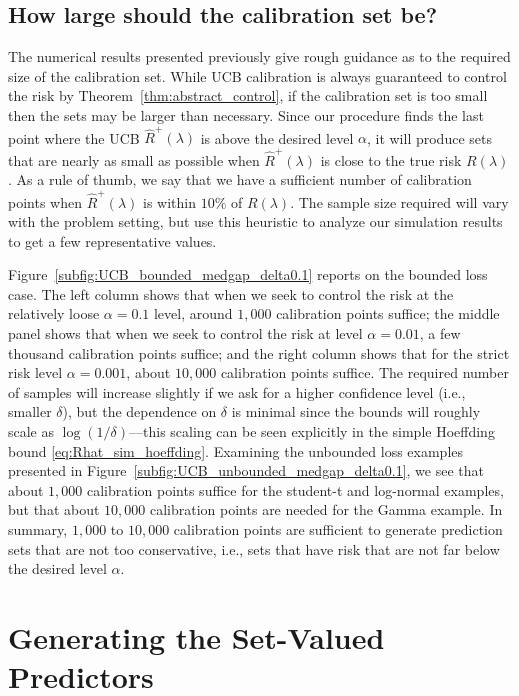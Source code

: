 \documentclass[10pt]{article}
\begin{document}
\subsection{How large should the calibration set be?}
The numerical results presented previously give rough guidance as to the required size of the calibration set. While UCB calibration is always guaranteed to control the risk by Theorem~\ref{thm:abstract_control}, if the calibration set is too small then the sets may be larger than necessary.
Since our procedure finds the last point where the UCB $\widehat{R}^+(\lambda)$ is above the desired level $\alpha$, it will produce sets that are nearly as small as possible when $\widehat{R}^+(\lambda)$ is close to the true risk $R(\lambda)$. As a rule of thumb, we say that we have a sufficient number of calibration points when $\widehat{R}^+(\lambda)$ is within $10\%$ of $R(\lambda)$. The sample size required will vary with the problem setting, but use this heuristic to analyze our simulation results to get a few representative values.

Figure~\ref{subfig:UCB_bounded_medgap_delta0.1} reports on the bounded loss case. The left column shows that when we seek to control the risk at the relatively loose $\alpha = 0.1$ level, around $1,000$ calibration points suffice; the middle panel shows that when we seek to control the risk at level $\alpha = 0.01$, a few thousand calibration points suffice; and the right column shows that for the strict risk level $\alpha = 0.001$, about $10,000$ calibration points suffice. The required number of samples will increase slightly if we ask for a higher confidence level (i.e., smaller $\delta$), but the dependence on $\delta$ is minimal since the bounds will roughly scale as $\log(1/\delta)$---this scaling can be seen explicitly in the simple Hoeffding bound \eqref{eq:Rhat_sim_hoeffding}. Examining the unbounded loss examples presented in Figure~\ref{subfig:UCB_unbounded_medgap_delta0.1}, we see that about $1,000$ calibration points suffice for the student-t and log-normal examples, but that about $10,000$ calibration points are needed for the Gamma example.
In summary, $1,000$ to $10,000$ calibration points are sufficient to generate prediction sets that are not too conservative, i.e., sets that have risk that are not far below the desired level $\alpha$.

\section{Generating the Set-Valued Predictors}
\label{sec:making_sets}
\end{document}
